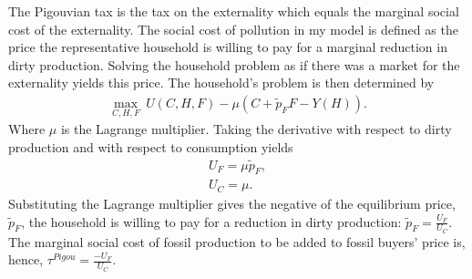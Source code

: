 The Pigouvian tax is the tax on the externality which equals the marginal social cost of the externality. 
The social cost of pollution in my model is defined as the price the representative household is willing to pay for a marginal reduction in dirty production. Solving the household problem as if there was a market for the externality yields this price. 
The household's problem is then determined by
\begin{align*}
\underset{C,H,F}{\max}\ U(C,H,F)-\mu \left(C+\tilde{p}_FF-Y(H)\right).
\end{align*}
Where $\mu$ is the Lagrange multiplier. Taking the derivative with respect to dirty production  and with respect to consumption yields
\begin{align*}
U_F=\mu \tilde{p}_F,\\
U_C=\mu.
\end{align*}
Substituting the Lagrange multiplier gives the negative of the equilibrium price, $\tilde{p}_F$, the household is willing to pay for a reduction in dirty production: $\tilde{p}_F=\frac{U_F}{U_C}$. The marginal social cost of fossil production to be added to fossil buyers' price is, hence, $\tau^{Pigou}=\frac{-U_F}{U_C}$.


